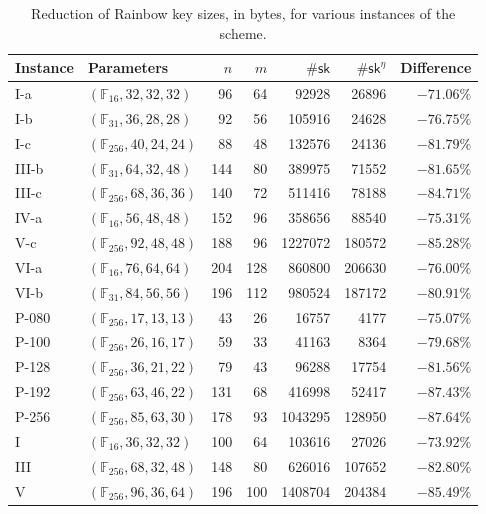 \documentclass[12pt, a4paper, oneside]{memoir}
\theoremstyle{definition}
\begin{document}
\begin{table}[htbp]
  \renewcommand{\arraystretch}{1.2}
  \setlength{\tabcolsep}{6.5pt}
  \centering
  \caption{Reduction of Rainbow key sizes, in bytes, for various instances of the scheme.}\label{tab:eta-diff}
  \begin{tabular}{*{2}{l}*{5}{r}}
    \toprule
    Instance & Parameters & $n$ & $m$ & $\#\mathsf{sk}$ & $\#\mathsf{sk}^{\eta}$ & Difference \\ \midrule
    I-a   & $(\mathbb{F}_{ 16}, 32, 32, 32)$ &  96 &  64 & \num{   92928} & \num{  26896} & $-71.06\%$ \\
    I-b   & $(\mathbb{F}_{ 31}, 36, 28, 28)$ &  92 &  56 & \num{  105916} & \num{  24628} & $-76.75\%$ \\
    I-c   & $(\mathbb{F}_{256}, 40, 24, 24)$ &  88 &  48 & \num{  132576} & \num{  24136} & $-81.79\%$ \\
    III-b & $(\mathbb{F}_{ 31}, 64, 32, 48)$ & 144 &  80 & \num{  389975} & \num{  71552} & $-81.65\%$ \\
    III-c & $(\mathbb{F}_{256}, 68, 36, 36)$ & 140 &  72 & \num{  511416} & \num{  78188} & $-84.71\%$ \\
    IV-a  & $(\mathbb{F}_{ 16}, 56, 48, 48)$ & 152 &  96 & \num{  358656} & \num{  88540} & $-75.31\%$ \\
    V-c   & $(\mathbb{F}_{256}, 92, 48, 48)$ & 188 &  96 & \num{ 1227072} & \num{ 180572} & $-85.28\%$ \\
    VI-a  & $(\mathbb{F}_{ 16}, 76, 64, 64)$ & 204 & 128 & \num{  860800} & \num{ 206630} & $-76.00\%$ \\
    VI-b  & $(\mathbb{F}_{ 31}, 84, 56, 56)$ & 196 & 112 & \num{  980524} & \num{ 187172} & $-80.91\%$ \\
    P-080 & $(\mathbb{F}_{256}, 17, 13, 13)$ &  43 &  26 & \num{   16757} & \num{   4177} & $-75.07\%$ \\
    P-100 & $(\mathbb{F}_{256}, 26, 16, 17)$ &  59 &  33 & \num{   41163} & \num{   8364} & $-79.68\%$ \\
    P-128 & $(\mathbb{F}_{256}, 36, 21, 22)$ &  79 &  43 & \num{   96288} & \num{  17754} & $-81.56\%$ \\
    P-192 & $(\mathbb{F}_{256}, 63, 46, 22)$ & 131 &  68 & \num{  416998} & \num{  52417} & $-87.43\%$ \\
    P-256 & $(\mathbb{F}_{256}, 85, 63, 30)$ & 178 &  93 & \num{ 1043295} & \num{ 128950} & $-87.64\%$ \\
    I     & $(\mathbb{F}_{ 16}, 36, 32, 32)$ & 100 &  64 & \num{  103616} & \num{  27026} & $-73.92\%$ \\
    III   & $(\mathbb{F}_{256}, 68, 32, 48)$ & 148 &  80 & \num{  626016} & \num{ 107652} & $-82.80\%$ \\
    V     & $(\mathbb{F}_{256}, 96, 36, 64)$ & 196 & 100 & \num{ 1408704} & \num{ 204384} & $-85.49\%$ \\
    \bottomrule
  \end{tabular}
\end{table}
\end{document}
